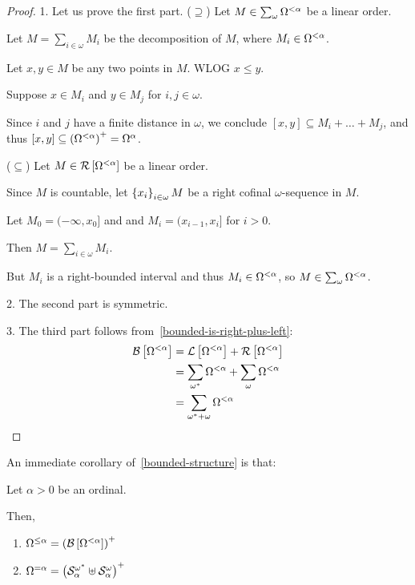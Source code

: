 \begin{proof}
  1. Let us prove the first part.
  ($\supseteq$) Let $M \in \sum_{\omega}{\Omega^{< \alpha}}$ be a linear order.

  Let $M = \sum_{i \in \omega} M_i$ be the decomposition of $M$,
  where $M_i \in \Omega^{< \alpha}$.

  Let $x, y \in M$ be any two points in $M$. WLOG $x \le y$.

  Suppose $x \in M_i$ and $y \in M_j$ for $i, j \in \omega$.

  Since $i$ and $j$ have a finite distance in $\omega$,
  we conclude $[x, y] \subseteq M_i + \ldots + M_j$,
  and thus $[x, y] \subseteq \left( {\Omega^{< \alpha}} \right)^+ = \Omega^{{\alpha}}$.

  ($\subseteq$) Let $M \in \mathcal{R} \left[ {{\Omega^{< \alpha}}} \right]$ be a linear order.

  Since $M$ is countable, let $\left\{ {x_i} \right\}_{i \in \omega} M$ be a right cofinal
  $\omega$-sequence in $M$.

  Let $M_0 = (-\infty, x_0]$ and and $M_i = (x_{i-1}, x_{i}]$ for $i > 0$.

  Then $M = \sum_{i \in \omega} M_i$.

  But $M_i$ is a right-bounded interval and thus $M_i \in \Omega^{< \alpha}$, so $M \in \sum_{\omega}{\Omega^{< \alpha}}$.

  2. The second part is symmetric.

  3. The third part follows from~\cref{bounded-is-right-plus-left}:
  \begin{align*}
    \mathcal{B} \left[ {{\Omega^{< \alpha}}} \right]
     & = \mathcal{L} \left[ {{\Omega^{< \alpha}}} \right] + \mathcal{R} \left[ {{\Omega^{< \alpha}}} \right]                     \\
     & = \sum_{\omega^\ast}{\Omega^{< \alpha}} + \sum_{\omega}{\Omega^{< \alpha}} \\
     & = \sum_{\omega^\ast + \omega}{\Omega^{< \alpha}}
  \end{align*}
\end{proof}

An immediate corollary of~\cref{bounded-structure} is that:
\begin{corollary}\label{le-alpha-corollary}
  Let $\alpha > 0$ be an ordinal.

  Then,
  \begin{enumerate}
    \item $\Omega^{\le \alpha} = \left( {\mathcal{B} \left[ {{\Omega^{< \alpha}}} \right]} \right)^+$
    \item $\Omega^{= \alpha}
            = \left( {
              \mathcal{S}^{\omega^\ast}_{\alpha}
              \uplus \mathcal{S}^{\omega}_{\alpha}
            } \right)^+$
  \end{enumerate}
\end{corollary}

